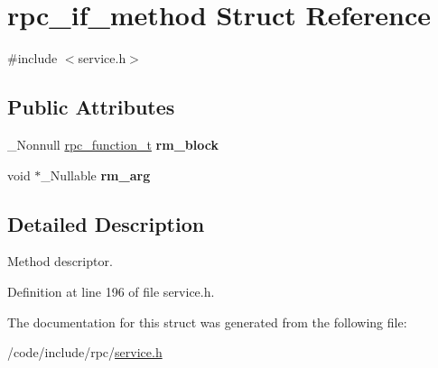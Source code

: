 \hypertarget{structrpc__if__method}{}\section{rpc\+\_\+if\+\_\+method Struct Reference}
\label{structrpc__if__method}


{\ttfamily \#include $<$service.\+h$>$}

\subsection*{Public Attributes}
\begin{DoxyCompactItemize}
\item 
\+\_\+\+Nonnull \hyperlink{service_8h_ae49a22468cfcd4adfa558078e9e4e312}{rpc\+\_\+function\+\_\+t} {\bfseries rm\+\_\+block}\hypertarget{structrpc__if__method_a5db192112740ed1adb36f74ff7c92a80}{}\label{structrpc__if__method_a5db192112740ed1adb36f74ff7c92a80}

\item 
void $\ast$\+\_\+\+Nullable {\bfseries rm\+\_\+arg}\hypertarget{structrpc__if__method_a85a2f339a726ef4afb885cbf157c0998}{}\label{structrpc__if__method_a85a2f339a726ef4afb885cbf157c0998}

\end{DoxyCompactItemize}


\subsection{Detailed Description}
Method descriptor. 

Definition at line 196 of file service.\+h.



The documentation for this struct was generated from the following file\+:\begin{DoxyCompactItemize}
\item 
/code/include/rpc/\hyperlink{service_8h}{service.\+h}\end{DoxyCompactItemize}
